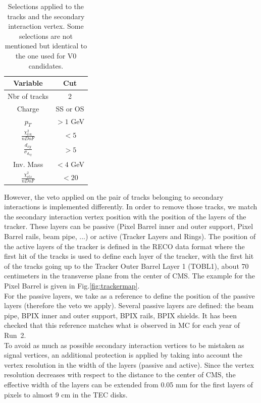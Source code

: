\documentclass{cernatlasnote}
\begin{document}
\begin{table}
\centering
    \begin{tabular}{|c|c|}
    \hline
    \rowcolor{lightgray} 
           Variable  &  Cut\\
            \hline
            Nbr of tracks & 2 \\
            \hline
              Charge & SS or OS\\
             \hline
            $p_T$ & $>1$ GeV\\
            \hline
            $\frac{\chi^{2}_{trk}}{nDoF}$  & $<5$\\
            \hline
            $\frac{d_{xy}}{\sigma_{d_{xy}}}$ & $>5$\\
            \hline
             Inv. Mass & $<4$ GeV\\
            \hline
              $\frac{\chi^{2}_{vtx}}{nDoF}$ & $<20$\\
             \hline
    \end{tabular}
    \caption{Selections applied to the tracks and the secondary interaction vertex. Some selections are not mentioned but identical to the one used for V0 candidates.}
    \label{tab:SECINTSEL}
\end{table}

However, the veto applied on the pair of tracks belonging to secondary interactions is implemented differently.  In order to remove those tracks, we match the secondary interaction vertex position with the position of the layers of the tracker. These layers can be passive (Pixel Barrel inner and outer support, Pixel Barrel rails, beam pipe, ...) or active (Tracker Layers and Rings). The position of the active layers of the tracker is defined in the RECO data format where the first hit of the tracks is used to define each layer of the tracker, with the first hit of the tracks going up to the Tracker Outer Barrel Layer 1 (TOBL1), about 70 centimeters in the transverse plane from the center of CMS. The example for the Pixel Barrel is given in Fig.\ref{fig:trackermap}.\\
For the passive layers, we take as a reference \cite{Sirunyan_2018} to define the position of the passive layers (therefore the veto we apply). Several passive layers are defined: the beam pipe, BPIX inner and outer support, BPIX rails, BPIX shields. It has been checked that this reference matches what is observed in MC for each year of Run~2.\\

To avoid as much as possible secondary interaction vertices to be mistaken as signal vertices, an additional protection is applied by taking into account the vertex resolution in the width of the layers (passive and active). Since the vertex resolution decreases with respect to the distance to the center of CMS, the effective width of the layers can be extended from 0.05 mm for the first layers of pixels to almost 9 cm in the TEC disks.
            
\end{document}
